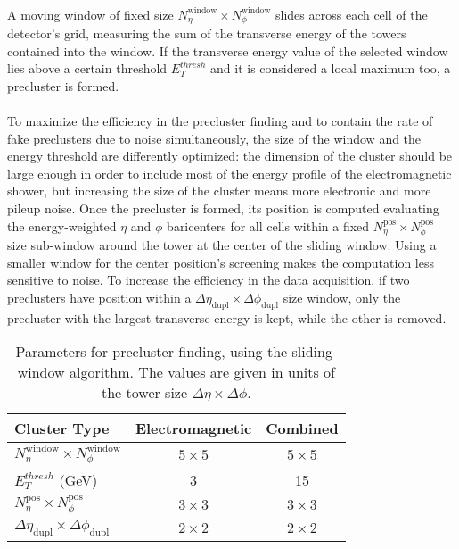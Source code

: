 \\A moving window of fixed size $N_{\eta}^{\text{window}} \times N_{\phi}^\text{window}$ slides across each cell of the detector's grid, measuring the sum of the transverse energy of  the towers contained into the window. If the transverse energy value of the selected window lies above a certain threshold $E_{T}^{thresh}$ and it is considered a local maximum too, a precluster is formed.
\\\\
To maximize the efficiency in the precluster finding and to contain the rate of fake preclusters due to noise simultaneously, the size of the window and the energy threshold are differently optimized: the dimension of the cluster should be large enough in order to include most of the energy profile of the electromagnetic shower, but increasing the size of the cluster means more electronic and more pileup noise. Once the precluster is formed, its position is computed evaluating the energy-weighted $\eta$ and $\phi$ baricenters for all cells within a fixed $N_{\eta}^{\text{pos}} \times N_{\phi}^\text{pos}$ size sub-window around the tower at the center of the sliding window. Using a smaller window for the center position's screening makes the computation less sensitive to noise. To increase the efficiency in the data acquisition, if two preclusters have position within a $\Delta \eta_{\text{dupl}} \times \Delta \phi_{\text{dupl}}$ size window, only the precluster with the largest transverse energy is kept, while the other is removed.
\begin{table}[h]
\caption{Parameters for precluster finding, using the sliding-window algorithm. The values are given in units of the tower size $\Delta \eta \times \Delta \phi$.}
\begin{center}
\begin{tabular}{ l | c | c }
  Cluster Type & Electromagnetic & Combined \\
  \hline			
  $N_{\eta}^{\text{window}} \times N_{\phi}^\text{window}$ & $5 \times 5$ & $5 \times 5$ \\
  $E_{T}^{thresh}$ (GeV) & 3 & 15 \\
  $N_{\eta}^{\text{pos}} \times N_{\phi}^\text{pos}$ & $3 \times 3$ & $3 \times 3$ \\
  $\Delta \eta_{\text{dupl}} \times \Delta \phi_{\text{dupl}}$ & $2 \times 2$ & $2 \times 2$
\end{tabular}
\end{center}
\end{table}
